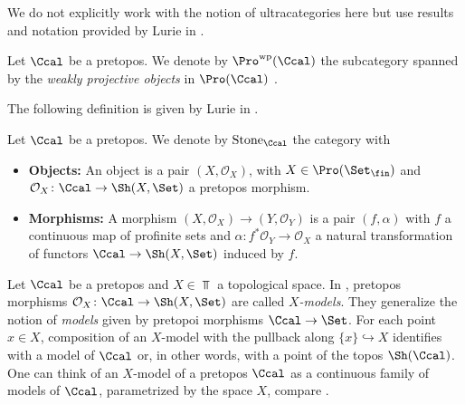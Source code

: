 \documentclass[leqno]{article}
\newcommand{\Ani}{\categ{Ani}}
\DeclareMathOperator{\FinSet}{\Set_{\fin}}
\DeclareMathOperator{\ProFin}{\Pro(\FinSet)}
\begin{document}
We do not explicitly work with the notion of ultracategories here but use results and notation provided by Lurie in \cite[Section 6.2]{Ultracategories}.
%
%
\begin{notation}
Let $\Ccal$ be a pretopos. We denote by \textbf{$\Pro^{\mathrm{wp}}(\Ccal)$} the subcategory spanned by the \textit{weakly projective objects} in $\Pro(\Ccal)$ .   
\end{notation}
%
The following definition is given by Lurie in \cite[Definition 6.3.8]{Ultracategories}.
%
\begin{definition}
Let $\Ccal$ be a pretopos.
We denote by \textbf{$\mathrm{Stone}_{\Ccal}$} the category with 
\begin{itemize}
    \item[1.] \textbf{Objects:} An object is a pair $(X,\mathcal{O}_X)$, with $X\in \ProFin$ and $\mathcal{O}_X\colon \Ccal \rightarrow \Sh(X, \Set)$ a pretopos morphism.
    \item[2.] \textbf{Morphisms:} A morphism $(X,\mathcal{O}_X)\rightarrow(Y,\mathcal{O}_Y)$ is a pair $(f,\alpha)$ with $f$ a continuous map of profinite sets and $\alpha\colon f^*\mathcal{O}_Y\rightarrow \mathcal{O}_X$ a natural transformation of functors $\Ccal \to \Sh(X,\Set)$ induced by $f$.  
\end{itemize}
\end{definition}
%
\begin{remark}
Let $\Ccal$ be a pretopos and $X\in \Top$ a topological space. In \cite{Ultracategories}, pretopos morphisms $\mathcal{O}_X\colon \Ccal \rightarrow \Sh(X, \Set)$ are called \textit{$X$-models}. They generalize the notion of \textit{models} given by pretopoi morphisms $\Ccal \rightarrow \Set$. For each point $x\in X$, composition of an $X$-model with the pullback along $\{x\}\hookrightarrow X$ identifies with a model of $\Ccal$ or, in other words, with a point of the topos $\Sh(\Ccal)$. One can think of an $X$-model of a pretopos $\Ccal$ as a continuous family of models of $\Ccal$, parametrized by the space $X$, compare \cite[Example 6.3.5, Remark 6.3.6, Remark 6.3.7]{Ultracategories}.
\end{remark}
\end{document}
